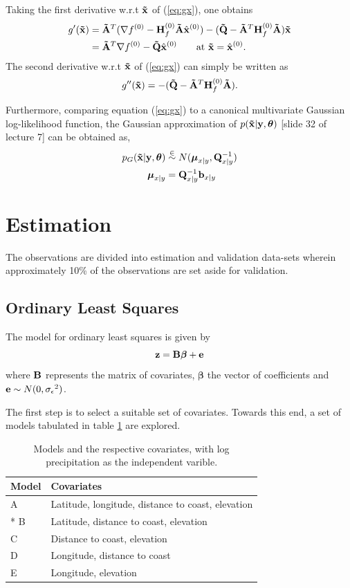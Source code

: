 \documentclass[a4paper,10pt]{article}
\def\bB{{\bf B}}
\def\bH{{\bf H}}
\def\bQ{{\bf Q}}
\def\btQ{{\bf \tilde Q}}
\def\btA{{\bf \tilde A}}
\def\bx{{\bf x}}
\def\bb{{\bf b}}
\def\be{{\bf e}}
\def\by{{\bf y}}
\def\bz{{\bf z}}
\def\btx{{\bf{\tilde x}}}
\def\btheta{{\boldsymbol \theta}}
\def\bbeta{{\boldsymbol \beta}}
\def\bmu{{\boldsymbol \mu}}
\def\sigmaeps{{\sigma_{\epsilon}}}
\begin{document}
Taking the first derivative w.r.t $\btx$ of (\ref{eq:gx}), one obtains
\begin{align}
 g'(\btx) &= \btA^T (\nabla f^{(0)} - \bH_f^{(0)} \btA \hat \bx^{(0)}) - (\btQ - \btA^T \bH_f^{(0)} \btA) \btx \nonumber \\
	  &= \btA^T \nabla f^{(0)} - \btQ \hat \bx^{(0)} \qquad \mathrm{at~} \btx = \hat \bx^{(0)}.
\end{align}
The second derivative w.r.t $\btx$ of (\ref{eq:gx}) can simply be written as
\begin{equation}
 g''(\btx) = -(\btQ - \btA^T \bH_f^{(0)} \btA).
\end{equation}

Furthermore, comparing equation (\ref{eq:gx}) to a canonical multivariate Gaussian log-likelihood function, the Gaussian approximation of $p(\btx|\by, \btheta)$ [slide 32 of lecture 7] can be obtained as,
\begin{align}
 p_G(\btx|\by, \btheta) &\stackrel{\in}{\sim} N(\bmu_{x|y}, \bQ_{x|y}^{-1}) \nonumber \\
 \bmu_{x|y} &= \bQ_{x|y}^{-1} \bb_{x|y}
 \label{eq:pxygauss}
\end{align}

\section{Estimation}
The observations are divided into estimation and validation data-sets wherein approximately 10\% of the observations are set aside for validation.
\subsection{Ordinary Least Squares}
The model for ordinary least squares is given by
\begin{equation*}
 \bz = \bB \bbeta + \be
\end{equation*}
where $\bB$ represents the matrix of covariates, $\bbeta$ the vector of coefficients and $\be \sim N(0,\sigmaeps^2)$.

The first step is to select a suitable set of covariates. Towards this end, a set of models tabulated in table \ref{tab:models} are explored.
\begin{table}[H]
\centering
\begin{tabular}{lp{9cm}}
\hline
{\bf Model} & {\bf Covariates} \\
\hline
 A & Latitude, longitude, distance to coast, elevation\\
 * B & Latitude, distance to coast, elevation\\
 C & Distance to coast, elevation\\
 D & Longitude, distance to coast\\
 E & Longitude, elevation\\
\hline
\end{tabular}
\caption{Models and the respective covariates, with log precipitation as the independent varible.}
\label{tab:models}
\end{table}
\end{document}
